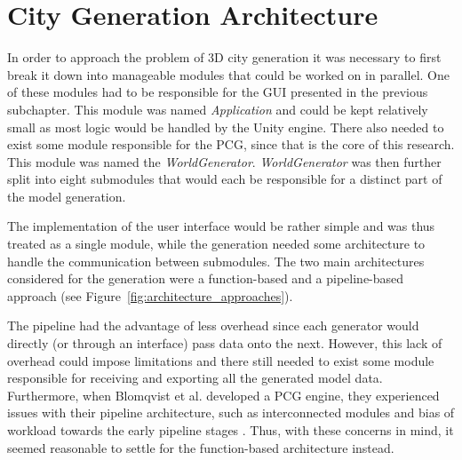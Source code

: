 \section{City Generation Architecture}

In order to approach the problem of 3D city generation it was necessary to first break it down into manageable modules that could be worked on in parallel.
One of these modules had to be responsible for the GUI presented in the previous subchapter.
This module was named \textit{Application} and could be kept relatively small as most logic would be handled by the Unity engine.
There also needed to exist some module responsible for the PCG, since that is the core of this research.
This module was named the \textit{WorldGenerator}.
\textit{WorldGenerator} was then further split into eight submodules that would each be responsible for a distinct part of the model generation.

The implementation of the user interface would be rather simple and was thus treated as a single module, while the generation needed some architecture to handle the communication between submodules.
The two main architectures considered for the generation were a function-based and a pipeline-based approach (see Figure~\ref{fig:architecture_approaches}).

The pipeline had the advantage of less overhead since each generator would directly (or through an interface) pass data onto the next.
However, this lack of overhead could impose limitations and there still needed to exist some module responsible for receiving and exporting all the generated model data.
Furthermore, when Blomqvist et al. developed a PCG engine, they experienced issues with their pipeline architecture, such as interconnected modules and bias of workload towards the early pipeline stages \cite[p. 45]{ba_landscape}.
Thus, with these concerns in mind, it seemed reasonable to settle for the function-based architecture instead.

